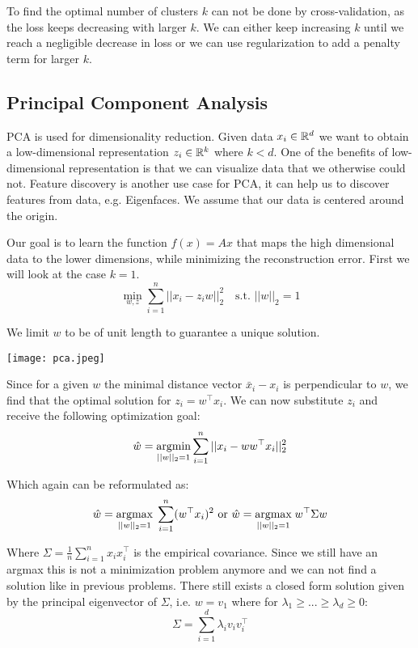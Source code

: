 To find the optimal number of clusters $k$ can not be done by cross-validation, as the loss keeps decreasing with larger $k$. We can either keep increasing $k$ until we reach a negligible decrease in loss or we can use regularization to add a penalty term for larger $k$.

\subsection{Principal Component Analysis}

PCA is used for dimensionality reduction. Given data $x_i \in \mathbb{R}^d$ we want to obtain a low-dimensional representation $z_i \in \mathbb{R}^k$ where $k < d$. One of the benefits of low-dimensional representation is that we can visualize data that we otherwise could not. Feature discovery is another use case for PCA, it can help us to discover features from data, e.g. Eigenfaces. We assume that our data is centered around the origin. 

Our goal is to learn the function $f(x) = Ax$ that maps the high dimensional data to the lower dimensions, while minimizing the reconstruction error. First we will look at the case $k = 1$.
$$\min_{w, z} \sum_{i=1}^n ||x_i - z_i w||_2^2 \quad \text{s.t. } ||w||_2 = 1$$

We limit $w$ to be of unit length to guarantee a unique solution.

\begin{center}
	\texttt{[image: pca.jpeg]}
\end{center}

Since for a given $w$ the minimal distance vector $\bar{x}_i - x_i$ is perpendicular to $w$, we find that the optimal solution for $z_i = w^\top x_i$. We can now substitute $z_i$ and receive the following optimization goal:
$$\hat{w} = \underset{||w||_2=1}{\text{argmin}} \sum_{i=1}^n ||x_i - w w^\top x_i||_2^2$$

Which again can be reformulated as:
$$\hat{w} = \underset{||w||_2=1}{\text{argmax}} \; \sum_{i=1}^n (w^\top x_i)^2 \text{ or } \hat{w} = \underset{||w||_2=1}{\text{argmax}} \; w^\top \Sigma w$$

Where $\Sigma = \frac{1}{n} \sum_{i=1}^n x_i x_i^\top$ is the empirical covariance. Since we still have an argmax this is not a minimization problem anymore and we can not find a solution like in previous problems. There still exists a closed form solution given by the principal eigenvector of $\Sigma$, i.e. $w = v_1$ where for $\lambda_1 \geq ... \geq \lambda_d \geq 0$:
$$\Sigma = \sum_{i=1}^d \lambda_i v_i v_i^\top$$

